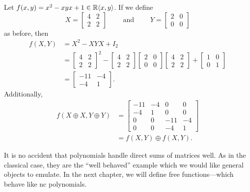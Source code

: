 \begin{example}%
\label{ex:multivareval}
  Let \(f(x,y) = x^2-xyx +1 \in \mathbb{R} \langle x,y \rangle  \). If we define
  \[
    X = \begin{bmatrix} 4 &2\\2&2 \end{bmatrix}  \qquad \text{ and } \qquad Y =\begin{bmatrix} 2&0\\0&0 \end{bmatrix}
  \]
  as before, then
  \begin{align*}
    f(X,Y) &= X^2 - XYX + I_2 \\
           &= \begin{bmatrix} 4 &2\\2&2 \end{bmatrix}^2
             -\begin{bmatrix} 4 &2\\2&2 \end{bmatrix}\begin{bmatrix} 2&0\\0&0 \end{bmatrix}\begin{bmatrix} 4 &2\\2&2 \end{bmatrix}
             +\begin{bmatrix} 1&0\\0&1 \end{bmatrix} \\
           &= \begin{bmatrix} -11&-4\\-4&1 \end{bmatrix}.
  \end{align*}
  Additionally,
  \begin{align*}
    f(X\oplus X,Y\oplus Y) &= \begin{bmatrix} -11&-4&0&0\\-4&1&0&0 \\ 0&0&-11&-4 \\ 0&0&-4&1 \end{bmatrix} \\
    &= f(X,Y) \oplus f(X,Y).
  \end{align*}
\end{example}
  It is no accident that polynomials handle direct sums of matrices well. As in
  the classical case, they are the ``well behaved'' example which we would like
  general objects to emulate. In the next chapter, we will define
  free functions---which behave like nc polynomials.


